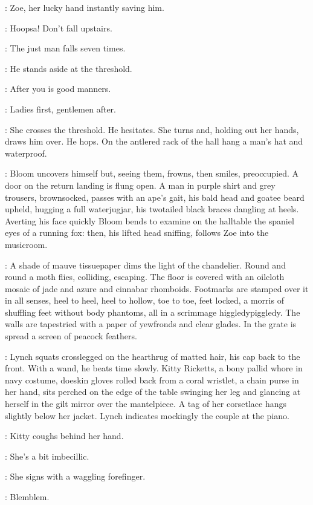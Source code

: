 :
Zoe,
her lucky hand instantly saving him.

\Zoe:
Hoopsa!
Don't fall upstairs.

\Bloom:
The just man falls seven times.

:
He stands aside at the threshold.

\Bloom:
After you is good manners.

\Zoe:
Ladies first,
gentlemen after.

:
She crosses the threshold.
He hesitates.
She turns and,
holding out her hands,
draws him over.
He hops.
On the antlered rack of the hall hang a man's hat and waterproof.

:
Bloom uncovers himself but,
seeing them,
frowns,
then smiles,
preoccupied.
A door on the return landing is flung open.
A man in purple shirt and grey trousers,
brownsocked,
passes with an ape's gait,
his bald head and goatee beard upheld,
hugging a full waterjugjar,
his twotailed black braces dangling at heels.
Averting his face quickly Bloom bends to examine on the halltable
the spaniel eyes of a running fox:
then,
his lifted head sniffing,
follows Zoe into the musicroom.

:
A shade of mauve tissuepaper dims the light of the chandelier.
Round and round a moth flies,
colliding,
escaping.
The floor is covered with an oilcloth mosaic of jade and azure and cinnabar rhomboids.
Footmarks are stamped over it in all senses,
heel to heel,
heel to hollow,
toe to toe,
feet locked,
a morris of shuffling feet without body phantoms,
all in a scrimmage higgledypiggledy.
The walls are tapestried with a paper of yewfronds and clear glades.
In the grate is spread a screen of peacock feathers.

:
Lynch squats crosslegged on the hearthrug of matted hair,
his cap back to the front.
With a wand,
he beats time slowly.
Kitty Ricketts,
a bony pallid whore in navy costume,
doeskin gloves rolled back from a coral wristlet,
a chain purse in her hand,
sits perched on the edge of the table swinging her leg
and glancing at herself in the gilt mirror over the mantelpiece.
A tag of her corsetlace hangs slightly below her jacket.
Lynch indicates mockingly the couple at the piano.

:
Kitty coughs behind her hand.

\Kitty:
She's a bit imbecillic.

:
She signs with a waggling forefinger.

\Kitty:
Blemblem.

